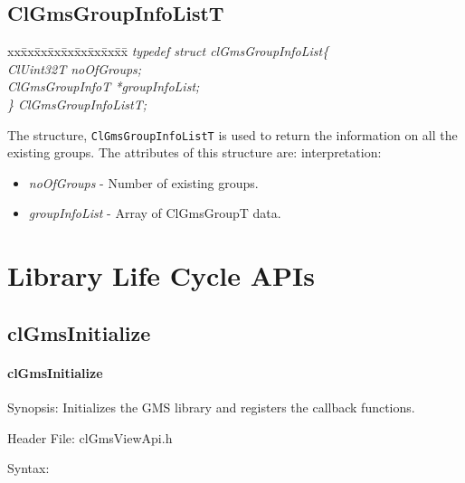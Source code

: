 \begin{flushleft}
\subsection{ClGmsGroupInfoListT}
\begin{tabbing}
xx\=xx\=xx\=xx\=xx\=xx\=xx\=xx\=xx\=\kill
\textit{typedef struct clGmsGroupInfoList\{}\\
\>\>\>\>\textit{ClUint32T           noOfGroups;}\\
\>\>\>\>\textit{ClGmsGroupInfoT     *groupInfoList;}\\
\textit{\} ClGmsGroupInfoListT;}\end{tabbing} 
The structure, {\tt{ClGmsGroupInfoListT}} is used to return the information on
all the existing groups. The attributes of this structure are:
interpretation:
\begin{itemize}
\item \textit{noOfGroups} - Number of existing groups.
\item \textit{groupInfoList} - Array of ClGmsGroupT data.
\end{itemize}

\newpage

\section{Library Life Cycle APIs}
\subsection{clGmsInitialize}
\hypertarget{pagegms101}{}\paragraph{cl\-Gms\-Initialize}\label{pagegms101}
\begin{Desc}
\item[Synopsis:]Initializes the GMS library and registers the callback functions.\end{Desc}
\begin{Desc}
\item[Header File:]clGmsViewApi.h\end{Desc}
\begin{Desc}
\item[Syntax:]


\end{Desc}
\end{flushleft}
